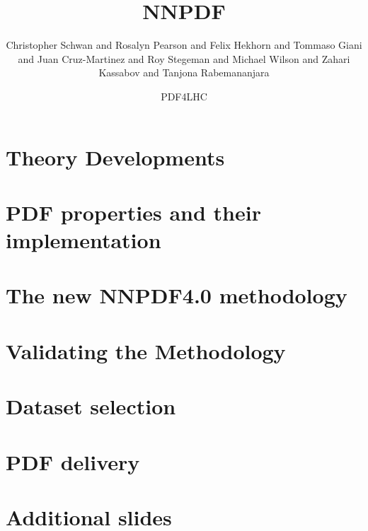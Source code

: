 \documentclass[xcolor={usenames,svgnames}]{beamer}
\author[NNPDF \& N3PDF]{
Christopher Schwan and
Rosalyn Pearson and
Felix Hekhorn and
Tommaso Giani and
Juan Cruz-Martinez and
Roy Stegeman and
Michael Wilson and
Zahari Kassabov and
Tanjona Rabemananjara
}
\title{NNPDF}
\date{PDF4LHC}
\author[\genericauthor]{} %
\institute{} %
\begin{document}
\section{Theory Developments}



\section{PDF properties and their implementation}



\section{The new NNPDF4.0 methodology}



\section{Validating the Methodology}



\section{Dataset selection}


\section{PDF delivery}


\section{Additional slides}





\end{document}
